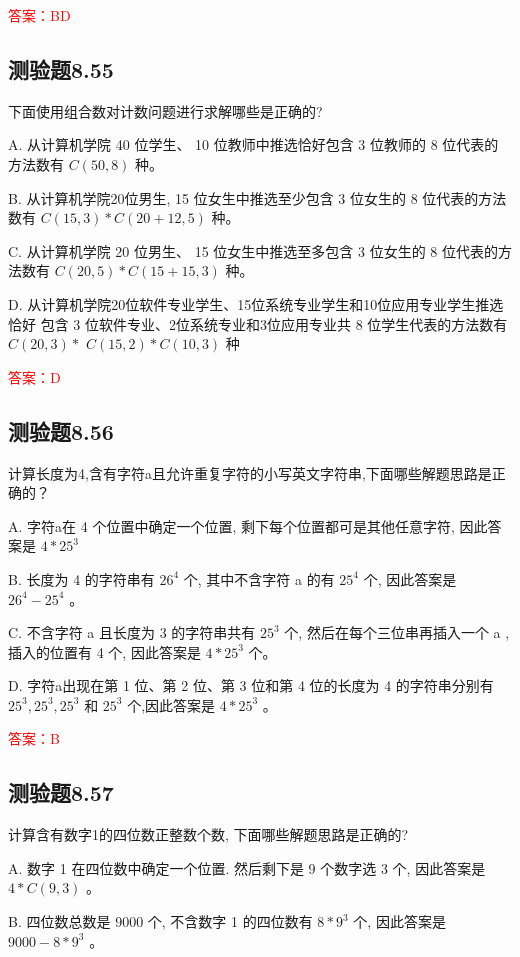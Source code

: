 \documentclass[UTF8, heading=true]{ctexart}
\begin{document}
\textcolor{red}{答案：BD}

\subsection{测验题8.55}

下面使用组合数对计数问题进行求解哪些是正确的?

A. 从计算机学院 40 位学生、 10 位教师中推选恰好包含 3 位教师的 8 位代表的方法数有 $C(50,8)$ 种。

B. 从计算机学院20位男生, 15 位女生中推选至少包含 3 位女生的 8 位代表的方法数有 $C(15,3) * C(20+12,5)$ 种。

C. 从计算机学院 20 位男生、 15 位女生中推选至多包含 3 位女生的 8 位代表的方法数有 $C(20,5) * C(15+15,3)$ 种。

D. 从计算机学院20位软件专业学生、15位系统专业学生和10位应用专业学生推选恰好
包含 3 位软件专业、2位系统专业和3位应用专业共 8 位学生代表的方法数有 $C(20,3) *$ $C(15,2) * C(10,3)$ 种

\textcolor{red}{答案：D}

\subsection{测验题8.56}

计算长度为4,含有字符a且允许重复字符的小写英文字符串,下面哪些解题思路是正确的？

A. 字符a在 4 个位置中确定一个位置, 剩下每个位置都可是其他任意字符, 因此答案是 $4 * 25^3$ 

B. 长度为 4 的字符串有 $26^4$ 个, 其中不含字符 a 的有 $25^4$ 个, 因此答案是 $26^4-25^4$ 。

C. 不含字符 a 且长度为 3 的字符串共有 $25^3$ 个, 然后在每个三位串再插入一个 a , 插入的位置有 4 个, 因此答案是 $4 * 25^3$ 个。

D. 字符a出现在第 1 位、第 2 位、第 3 位和第 4 位的长度为 4 的字符串分别有 $25^3, 25^3, 25^3$ 和 $25^3$ 个,因此答案是 $4 * 25^3$ 。

\textcolor{red}{答案：B}

\subsection{测验题8.57}
计算含有数字1的四位数正整数个数, 下面哪些解题思路是正确的?

A. 数字 1 在四位数中确定一个位置. 然后剩下是 9 个数字选 3 个, 因此答案是 $4 * C(9,3)$ 。

B. 四位数总数是 9000 个, 不含数字 1 的四位数有 $8 * 9^3$ 个, 因此答案是 $9000-8 * 9^3$ 。
\end{document}
